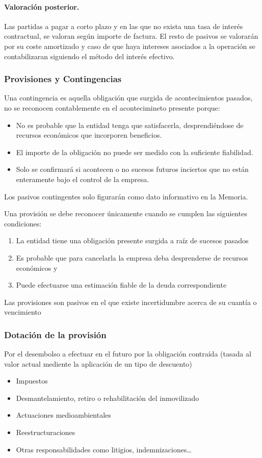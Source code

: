 \paragraph{Valoración posterior.}
Las partidas a pagar a corto plazo y en las que no exista una tasa de interés contractual, se valoran según importe de factura. El resto de pasivos se valorarán por su coste amortizado y caso de que haya intereses asociados a la operación se contabilizaran siguiendo el método del interés efectivo.

\subsubsection{Provisiones y Contingencias}
Una contingencia es aquella obligación que surgida de acontecimientos pasados, no se reconocen contablemente en el acontecimineto presente porque:
\begin{itemize}
    \item No es probable que la entidad tenga que satisfacerla, desprendiéndose de recursos económicos que incorporen beneficios.
    \item El importe de la obligación no puede ser medido con la suficiente fiabilidad.
    \item Solo se confirmará si acontecen o no sucesos futuros inciertos que no están enteramente bajo el control de la empresa.
\end{itemize}

Los pasivos contingentes solo figurarán como dato informativo en la Memoria.

Una provisión se debe reconocer únicamente cuando se cumplen las siguientes condiciones:
\begin{enumerate}
    \item La entidad tiene una obligación presente surgida a raíz de sucesos pasados
    \item Es probable que para cancelarla la empresa deba desprenderse de recursos económicos y
    \item Puede efectuarse una estimación fiable de la deuda correspondiente
\end{enumerate}

Las provisiones son pasivos en el que existe incertidumbre acerca de su cuantía o vencimiento

\subsubsection{Dotación de la provisión}
Por el desembolso a efectuar en el futuro por la obligación contraída (tasada al valor actual mediente la aplicación de un tipo de descuento)
\begin{itemize}
    \item Impuestos
    \item Desmantelamiento, retiro o rehabilitación del inmovilizado
    \item Actuaciones medioambientales
    \item Reestructuraciones
    \item Otras responsabilidades como litigios, indemnizaciones\dots
\end{itemize}

